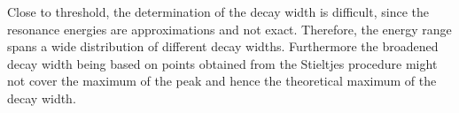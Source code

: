 Close to threshold, the determination of the decay width is difficult, since
the resonance energies are approximations and not exact. Therefore, the
energy range spans a wide distribution of different decay widths. Furthermore
the broadened decay width being based on points obtained from the Stieltjes
procedure might not cover the maximum of the peak and hence the theoretical
maximum of the decay width.

